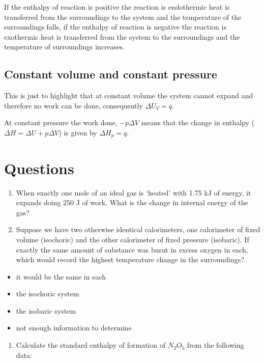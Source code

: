 \documentclass[
]{book}
\providecommand{\tightlist}{%
  \setlength{\itemsep}{0pt}\setlength{\parskip}{0pt}}
\begin{document}
If the enthalpy of reaction is positive the reaction is endothermic heat is transferred from the surroundings to the system and the temperature of the surroundings falls, if the enthalpy of reaction is negative the reaction is exothermic heat is transferred from the system to the surroundings and the temperature of surroundings increases.

\hypertarget{constant-volume-and-constant-pressure}{%
\subsection{Constant volume and constant pressure}\label{constant-volume-and-constant-pressure}}

This is just to highlight that at constant volume the system cannot expand and therefore no work can be done, consequently \(\Delta U_V = q\).

At constant pressure the work done, \(-p \Delta V\) means that the change in enthalpy (\(\Delta H = \Delta U + p \Delta V\)) is given by \(\Delta H_p=q\).

\hypertarget{questions}{%
\section{Questions}\label{questions}}

\begin{enumerate}
\def\labelenumi{\arabic{enumi}.}
\item
  When exactly one mole of an ideal gas is `heated' with 1.75 kJ of energy, it expands doing 250 J of work. What is the change in internal energy of the gas?
\item
  Suppose we have two otherwise identical calorimeters, one calorimeter of fixed volume (isochoric) and the other calorimeter of fixed pressure (isobaric). If exactly the same amount of substance was burnt in excess oxygen in each, which would record the highest temperature change in the surroundings?
\end{enumerate}

\begin{itemize}
\tightlist
\item
  it would be the same in each
\item
  the isochoric system
\item
  the isobaric system
\item
  not enough information to determine
\end{itemize}

\begin{enumerate}
\def\labelenumi{\arabic{enumi}.}
\setcounter{enumi}{2}
\tightlist
\item
  Calculate the standard enthalpy of formation of \(N_2 O_5\) from the following data:
\end{enumerate}
\end{document}

